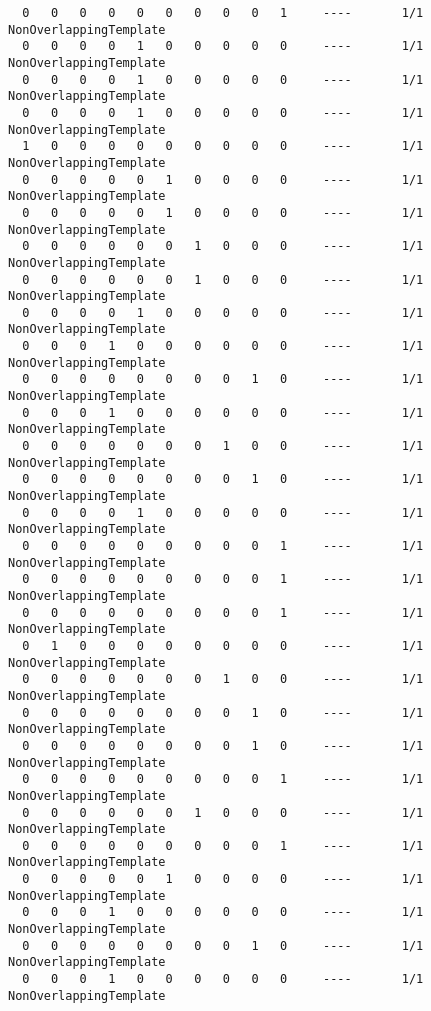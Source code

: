 \begin{code}
\begin{verbatim}
  0   0   0   0   0   0   0   0   0   1     ----       1/1       NonOverlappingTemplate
  0   0   0   0   1   0   0   0   0   0     ----       1/1       NonOverlappingTemplate
  0   0   0   0   1   0   0   0   0   0     ----       1/1       NonOverlappingTemplate
  0   0   0   0   1   0   0   0   0   0     ----       1/1       NonOverlappingTemplate
  1   0   0   0   0   0   0   0   0   0     ----       1/1       NonOverlappingTemplate
  0   0   0   0   0   1   0   0   0   0     ----       1/1       NonOverlappingTemplate
  0   0   0   0   0   1   0   0   0   0     ----       1/1       NonOverlappingTemplate
  0   0   0   0   0   0   1   0   0   0     ----       1/1       NonOverlappingTemplate
  0   0   0   0   0   0   1   0   0   0     ----       1/1       NonOverlappingTemplate
  0   0   0   0   1   0   0   0   0   0     ----       1/1       NonOverlappingTemplate
  0   0   0   1   0   0   0   0   0   0     ----       1/1       NonOverlappingTemplate
  0   0   0   0   0   0   0   0   1   0     ----       1/1       NonOverlappingTemplate
  0   0   0   1   0   0   0   0   0   0     ----       1/1       NonOverlappingTemplate
  0   0   0   0   0   0   0   1   0   0     ----       1/1       NonOverlappingTemplate
  0   0   0   0   0   0   0   0   1   0     ----       1/1       NonOverlappingTemplate
  0   0   0   0   1   0   0   0   0   0     ----       1/1       NonOverlappingTemplate
  0   0   0   0   0   0   0   0   0   1     ----       1/1       NonOverlappingTemplate
  0   0   0   0   0   0   0   0   0   1     ----       1/1       NonOverlappingTemplate
  0   0   0   0   0   0   0   0   0   1     ----       1/1       NonOverlappingTemplate
  0   1   0   0   0   0   0   0   0   0     ----       1/1       NonOverlappingTemplate
  0   0   0   0   0   0   0   1   0   0     ----       1/1       NonOverlappingTemplate
  0   0   0   0   0   0   0   0   1   0     ----       1/1       NonOverlappingTemplate
  0   0   0   0   0   0   0   0   1   0     ----       1/1       NonOverlappingTemplate
  0   0   0   0   0   0   0   0   0   1     ----       1/1       NonOverlappingTemplate
  0   0   0   0   0   0   1   0   0   0     ----       1/1       NonOverlappingTemplate
  0   0   0   0   0   0   0   0   0   1     ----       1/1       NonOverlappingTemplate
  0   0   0   0   0   1   0   0   0   0     ----       1/1       NonOverlappingTemplate
  0   0   0   1   0   0   0   0   0   0     ----       1/1       NonOverlappingTemplate
  0   0   0   0   0   0   0   0   1   0     ----       1/1       NonOverlappingTemplate
  0   0   0   1   0   0   0   0   0   0     ----       1/1       NonOverlappingTemplate

\end{verbatim}
\end{code}
